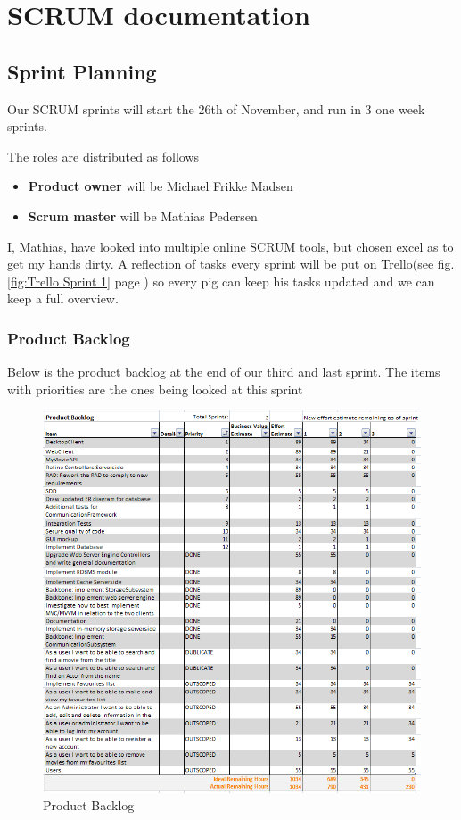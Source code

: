 \chapter{SCRUM documentation}

\section{Sprint Planning}

Our SCRUM sprints will start the 26th of November, and run in 3 one week sprints.

The roles are distributed as follows

\begin{itemize}
\item \textbf{Product owner} will be Michael Frikke Madsen
\item \textbf{Scrum master} will be Mathias Pedersen
\end{itemize}

I, Mathias, have looked into multiple online SCRUM tools, but chosen excel as to get my hands dirty. A reflection of tasks every sprint will be put on Trello(see fig. \ref{fig:Trello Sprint 1} page \pageref{fig:Trello Sprint 1}) so every pig can keep his tasks updated and we can keep a full overview.

\newpage
\subsection{Product Backlog}
\label{sec:Product Backlog}
Below is the product backlog at the end of our third and last sprint. The items with priorities are the ones being looked at this sprint

\begin{figure}[H]
\includegraphics[scale=0.75]{img/SCRUM/productBacklog.PNG}
\caption{Product Backlog}
\label{fig:Product Backlog}
\end{figure}


